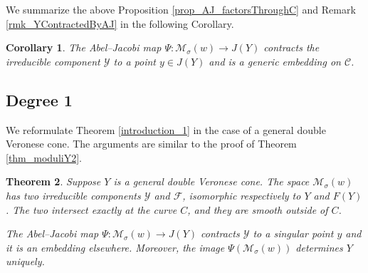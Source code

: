 \documentclass[11pt]{amsart}
\newtheorem{thm}{Theorem}[section]
\newtheorem{corollary}[thm]{Corollary}
\theoremstyle{definition}
\newcommand{\sY}{\mathcal{Y}}
\newcommand{\sM}{\mathcal{M}}
\newcommand{\sC}{\mathcal{C}}
\newcommand{\sF}{\mathcal{F}}
\begin{document}
We summarize the above Proposition \ref{prop_AJ_factorsThroughC} and Remark \ref{rmk_YContractedByAJ} in the following Corollary.

\begin{corollary}\label{cor_C_generically_embedded_by_AJ}
The Abel--Jacobi map $\Psi\colon \sM_\sigma(w) \to J(Y)$ contracts the irreducible component $\mathcal Y$ to a point $y\in J(Y)$ and is a generic embedding on $\sC$.
\end{corollary}




\subsection{Degree 1}\label{sec_d=1}

We reformulate Theorem \ref{introduction_1} in the case of a general double Veronese cone. The arguments are similar to the proof of Theorem \ref{thm_moduliY2}.

\begin{thm}\label{thm_moduliY1}
Suppose $Y$ is a general double Veronese cone. The space $\sM_\sigma(w)$ has two irreducible components $\sY$ and $\sF$, isomorphic respectively to $Y$ and $F(Y)$. The two intersect exactly at the curve $C$, and they are smooth outside of $C$.

The Abel--Jacobi map $\Psi \colon \sM_\sigma(w) \to J(Y)$ contracts $\mathcal Y$ to a singular point $y$ and it is an embedding elsewhere. Moreover, the image $\Psi(\sM_\sigma(w))$ determines $Y$ uniquely.
\end{thm}
\end{document}
